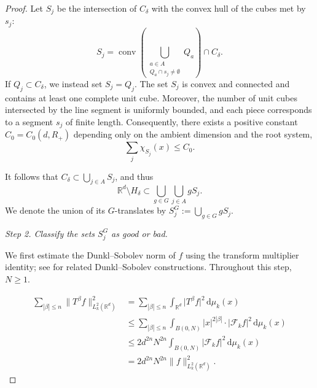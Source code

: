 \documentclass[12pt]{article}
\begin{document}
\begin{proof}
Let $S_j$ be the intersection of $C_\delta$ with the convex hull of the cubes met by $s_j$:
\[
S_j=\operatorname{conv}\left(\bigcup_{\substack{a\in A\\Q_a\cap s_j\ne\emptyset}}Q_a\right)\cap C_\delta.
\]
If $Q_j\subset C_\delta$, we instead set $S_j=Q_j$.
The set $S_j$ is convex and connected and contains at least one complete unit cube. Moreover, the number of unit cubes intersected by the line segment is uniformly bounded, and each piece corresponds to a segment $s_j$ of finite length. Consequently, there exists a positive constant $C_0 = C_0(d, R_+)$ depending only on the ambient dimension and the root system,
\[
\sum_{j} \chi_{S_j}(x) \le C_0.
\]

It follows that $C_\delta \subset \bigcup_{j\in A} S_j$, and thus
\[
\mathbb{R}^d \setminus H_\delta \subset \bigcup_{g\in G} \bigcup_{j\in A} g S_j.
\]
We denote the union of its $G$-translates by $S_j^G:=\bigcup_{g\in G}gS_j$.

\emph{Step 2. Classify the sets $S_j^G$ as good or bad.}

We first estimate the Dunkl--Sobolev norm of $f$ using the transform multiplier identity; see \cite{HM5} for related Dunkl--Sobolev constructions. Throughout this step, $N\ge1$.

\begin{align*}
\sum_{|\beta|\le n} \|T^\beta f\|_{L_k^2(\mathbb{R}^d)}^2 
&= \sum_{|\beta|\le n} \int_{\mathbb{R}^d} \big|T^\beta f\big|^2 \, \mathrm{d}\mu_k(x) \\
&\le \sum_{|\beta|\le n} \int_{B(0,N)} |x|^{2|\beta|} \cdot \big|\mathcal{F}_k f\big|^2 \, \mathrm{d}\mu_k(x) \\
&\le 2d^{2n} N^{2n} \int_{B(0,N)} \big|\mathcal{F}_k f\big|^2 \, \mathrm{d}\mu_k(x) \\
&= 2d^{2n} N^{2n} \|f\|_{L_k^2(\mathbb{R}^d)}^2.
\end{align*}



\end{proof}
\end{document}
